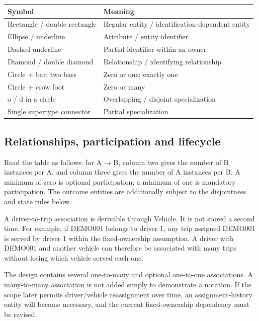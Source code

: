 \documentclass[11pt,a4paper]{article}
\begin{document}
\par\begingroup\small\noindent
\begin{tabularx}{\linewidth}{YY}
\toprule
Symbol & Meaning\\\midrule
Rectangle / double rectangle & Regular entity / identification-dependent entity\\
Ellipse / underline & Attribute / entity identifier\\
Dashed underline & Partial identifier within an owner\\
Diamond / double diamond & Relationship / identifying relationship\\
Circle + bar; two bars & Zero or one; exactly one\\
Circle + crow foot & Zero or many\\
o / d in a circle & Overlapping / disjoint specialization\\
Single supertype connector & Partial specialization\\
\bottomrule
\end{tabularx}
\par\endgroup
\clearpage


\subsection{Relationships, participation and lifecycle}
Read the table as follows: for A → B, column two gives the number of B instances per A, and column three gives the number of A instances per B. A minimum of zero is optional participation; a minimum of one is mandatory participation. The outcome entities are additionally subject to the disjointness and state rules below.

A driver-to-trip association is derivable through Vehicle. It is not stored a second time. For example, if DEMO001 belongs to driver 1, any trip assigned DEMO001 is served by driver 1 within the fixed-ownership assumption. A driver with DEMO001 and another vehicle can therefore be associated with many trips without losing which vehicle served each one.

The design contains several one-to-many and optional one-to-one associations. A many-to-many association is not added simply to demonstrate a notation. If the scope later permits driver/vehicle reassignment over time, an assignment-history entity will become necessary, and the current fixed-ownership dependency must be revised.
\end{document}
